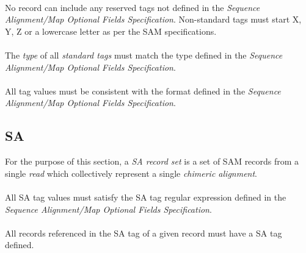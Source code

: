 \documentclass[10pt]{article}
\begin{document}
\paragraph{}

No record can include any reserved tags not defined in the
{\sl Sequence Alignment/Map Optional Fields Specification}.
Non-standard tags must start X, Y, Z or a lowercase letter as per the SAM specifications.

\paragraph{}

The \textit{type} of all \textit{standard tags} must match the type
defined in the {\sl Sequence Alignment/Map Optional Fields Specification}.

\paragraph{}

All tag values must be consistent with the format
defined in the {\sl Sequence Alignment/Map Optional Fields Specification}.

\subsection{SA}

For the purpose of this section, a \textit{SA record set} is a set of SAM records
from a single \textit{read} which collectively represent a single \textit{chimeric alignment}.

\paragraph{}

All SA tag values must satisfy the SA tag regular expression
defined in the {\sl Sequence Alignment/Map Optional Fields Specification}.

\paragraph{}

All records referenced in the SA tag of a given record must have a SA tag defined.

\paragraph{}
\end{document}
